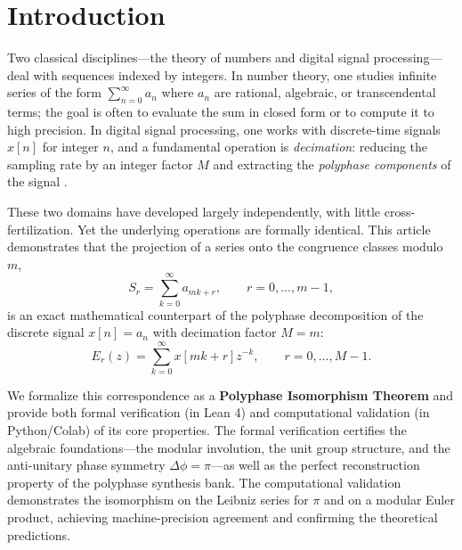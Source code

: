 \documentclass{mcom-l} %
\theoremstyle{plain} %
\theoremstyle{definition} %
\theoremstyle{remark} %
\begin{document}
\maketitle %

\section{Introduction}
Two classical disciplines---the theory of numbers and digital signal processing---deal with sequences indexed by integers. In number theory, one studies infinite series of the form \(\sum_{n=0}^{\infty} a_n\) where \(a_n\) are rational, algebraic, or transcendental terms; the goal is often to evaluate the sum in closed form or to compute it to high precision. In digital signal processing, one works with discrete-time signals \(x[n]\) for integer \(n\), and a fundamental operation is \emph{decimation}: reducing the sampling rate by an integer factor \(M\) and extracting the \emph{polyphase components} of the signal \cite{vaidyanathan}.

These two domains have developed largely independently, with little cross-fertilization. Yet the underlying operations are formally identical. This article demonstrates that the projection of a series onto the congruence classes modulo \(m\),
\begin{equation}
S_r = \sum_{k=0}^{\infty} a_{mk + r}, \qquad r = 0, \dots, m-1,
\label{eq:modproj}
\end{equation}
is an exact mathematical counterpart of the polyphase decomposition of the discrete signal \(x[n] = a_n\) with decimation factor \(M = m\):
\begin{equation}
E_r(z) = \sum_{k=0}^{\infty} x[mk + r] z^{-k}, \qquad r = 0, \dots, M-1.
\label{eq:polyphase}
\end{equation}

We formalize this correspondence as a \textbf{Polyphase Isomorphism Theorem} and provide both formal verification (in Lean 4) and computational validation (in Python/Colab) of its core properties. The formal verification certifies the algebraic foundations---the modular involution, the unit group structure, and the anti-unitary phase symmetry \(\Delta\phi = \pi\)---as well as the perfect reconstruction property of the polyphase synthesis bank. The computational validation demonstrates the isomorphism on the Leibniz series for \(\pi\) and on a modular Euler product, achieving machine-precision agreement and confirming the theoretical predictions.
\end{document}
